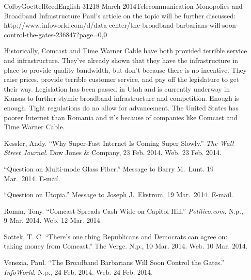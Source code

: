 \documentclass[12pt]{article}
\begin{document}
\begin{mla}{Colby}{Goettel}{Reed}{English 312}{18 March 2014}{Telecommunication Monopolies and Broadband Infrastructure}
Paul's article on the topic will be further discussed: http://www.infoworld.com/d/data-center/the-broadband-barbarians-will-soon-control-the-gates-236847?page=0,0

Historically, Comcast and Time Warner Cable have both provided terrible service and infrastructure. They've already shown that they have the infrastructure in place to provide quality bandwidth, but don't because there is no incentive. They raise prices, provide terrible customer service, and pay off the legislature to get their way. Legislation has been passed in Utah and is currently underway in Kansas to further stymie broadband infrastructure and competition. Enough is enough. Tight regulations do no allow for advancement. The United States has poorer Internet than Romania and it's because of companies like Comcast and Time Warner Cable.

\begin{workscited}
    \bibent Kessler, Andy. ``Why Super-Fast Internet Is Coming Super Slowly.'' \textit{The Wall Street Journal}. Dow Jones \& Company, 23 Feb. 2014. Web. 23 Feb. 2014.
    
    \bibent ``Question on Multi-mode Glass Fiber.'' Message to Barry M.\ Lunt. 19 Mar.\ 2014. E-mail.
    
    \bibent ``Question on Utopia.'' Message to Joseph J.\ Ekstrom. 19 Mar.\ 2014. E-mail.
    
    \bibent Romm, Tony. ``Comcast Spreads Cash Wide on Capitol Hill.'' \textit{Politico.com}. N.p., 9 Mar. 2014. Web. 12 Mar. 2014.
    
    \bibent Sottek, T. C. ``There's one thing Republicans and Democrats can agree on: taking money from Comcast.'' The Verge. N.p., 10 Mar. 2014. Web. 10 Mar. 2014.
    
    \bibent Venezia, Paul. ``The Broadband Barbarians Will Soon Control the Gates.'' \textit{InfoWorld}. N.p., 24 Feb. 2014. Web. 24 Feb. 2014.
\end{workscited}

\end{mla}
\end{document}
